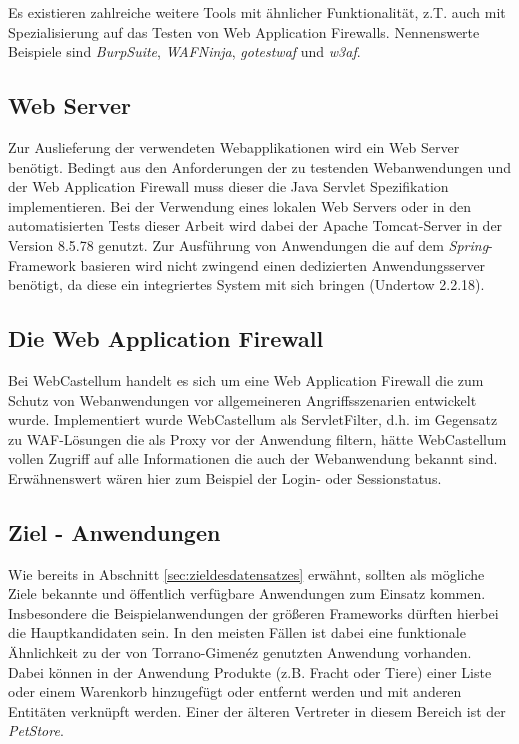 Es existieren zahlreiche weitere Tools mit ähnlicher Funktionalität, z.T. auch mit Spezialisierung auf das Testen von Web Application Firewalls. Nennenswerte Beispiele sind \emph{BurpSuite}, \emph{WAFNinja}, \emph{gotestwaf} und \emph{w3af}.  

\subsection{Web Server}

Zur Auslieferung der verwendeten Webapplikationen wird ein Web Server benötigt. Bedingt aus den Anforderungen der zu testenden Webanwendungen und der Web Application Firewall muss dieser die Java Servlet Spezifikation implementieren. Bei der Verwendung eines lokalen Web Servers oder in den automatisierten Tests dieser Arbeit wird dabei der Apache Tomcat-Server in der Version 8.5.78 genutzt. Zur Ausführung von Anwendungen die auf dem \emph{Spring}-Framework basieren wird nicht zwingend einen dedizierten Anwendungsserver benötigt, da diese ein integriertes System mit sich bringen (Undertow 2.2.18).

\subsection{Die Web Application Firewall}
Bei WebCastellum handelt es sich um eine Web Application Firewall die zum Schutz von Webanwendungen vor allgemeineren Angriffsszenarien entwickelt wurde. Implementiert wurde WebCastellum als ServletFilter, d.h. im Gegensatz zu WAF-Lösungen die als Proxy vor der Anwendung filtern, hätte WebCastellum vollen Zugriff auf alle Informationen die auch der Webanwendung bekannt sind. Erwähnenswert wären hier zum Beispiel der Login- oder Sessionstatus. 


\subsection{Ziel - Anwendungen}
\label{sec:targetapp}
Wie bereits in Abschnitt \ref{sec:zieldesdatensatzes} erwähnt, sollten als mögliche Ziele bekannte und öffentlich verfügbare Anwendungen zum Einsatz kommen. Insbesondere die Beispielanwendungen der größeren Frameworks dürften hierbei die Hauptkandidaten sein. In den meisten Fällen ist dabei eine funktionale Ähnlichkeit zu der von Torrano-Gimenéz genutzten Anwendung vorhanden. Dabei können in der Anwendung Produkte (z.B. Fracht oder Tiere) einer Liste oder einem Warenkorb hinzugefügt oder entfernt werden und mit anderen Entitäten verknüpft werden. Einer der älteren Vertreter in diesem Bereich ist der \emph{PetStore}.

